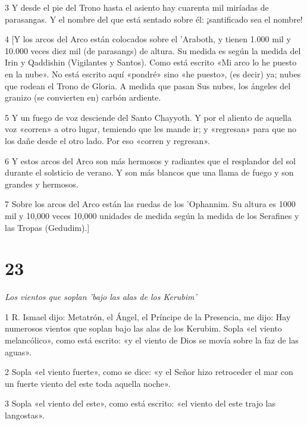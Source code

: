 \par 3 Y desde el pie del Trono hasta el asiento hay cuarenta mil miríadas de parasangas. Y el nombre del que está sentado sobre él: ¡santificado sea el nombre!

\par 4 [Y los arcos del Arco están colocados sobre el 'Araboth, y tienen 1.000 mil y 10.000 veces diez mil (de parasangs) de altura. Su medida es según la medida del Irin y Qaddishin (Vigilantes y Santos). Como está escrito «Mi arco lo he puesto en la nube». No está escrito aquí «pondré» sino «he puesto», (es decir) ya; nubes que rodean el Trono de Gloria. A medida que pasan Sus nubes, los ángeles del granizo (se convierten en) carbón ardiente.

\par 5 Y un fuego de voz desciende del Santo Chayyoth. Y por el aliento de aquella voz «corren» a otro lugar, temiendo que les mande ir; y «regresan» para que no los dañe desde el otro lado. Por eso «corren y regresan».

\par 6 Y estos arcos del Arco son más hermosos y radiantes que el resplandor del sol durante el solsticio de verano. Y son más blancos que una llama de fuego y son grandes y hermosos.

\par 7 Sobre los arcos del Arco están las ruedas de los 'Ophannim. Su altura es 1000 mil y 10,000 veces 10,000 unidades de medida según la medida de los Serafines y las Tropas (Gedudim).]

\chapter{23}

\par \textit{Los vientos que soplan 'bajo las alas de los Kerubim'}

\par 1 R. Ismael dijo: Metatrón, el Ángel, el Príncipe de la Presencia, me dijo: Hay numerosos vientos que soplan bajo las alas de los Kerubim. Sopla «el viento melancólico», como está escrito: «y el viento de Dios se movía sobre la faz de las aguas».

\par 2 Sopla «el viento fuerte», como se dice: «y el Señor hizo retroceder el mar con un fuerte viento del este toda aquella noche».

\par 3 Sopla «el viento del este», como está escrito: «el viento del este trajo las langostas».

